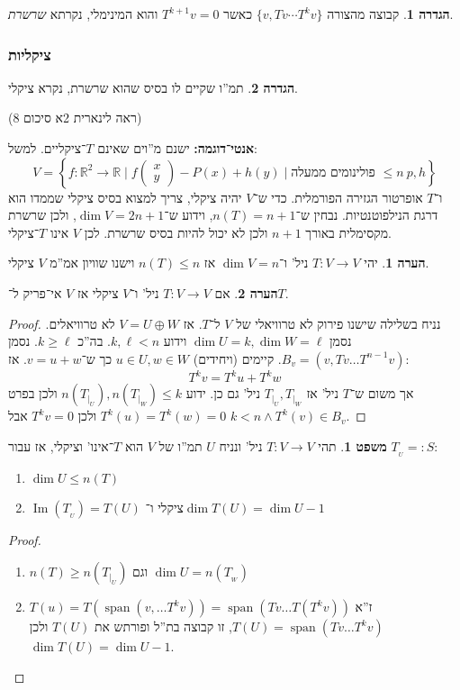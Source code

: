 \documentclass[a4paper]{article}
\newcommand\R     {\mathbb{R}}
\newcommand\ml    {\ell}
\DeclareMathOperator\Img   {Im}
\DeclareMathOperator{\Sp}      {span}
\newcommand\co        {\colon}
\newcommand\pms[1]    {\begin{pmatrix}
		#1
\end{pmatrix}}
\newcommand\ccb[1]    {\left \{ #1 \right \}}
\theoremstyle{definition}
\newtheorem{Theorem}{משפט}
\newtheorem{definition}{הגדרה}
\newtheorem{Remark}{הערה}
\newcommand\theo  [1] {\begin{Theorem}#1\end{Theorem}}
\newcommand\defi  [1] {\begin{definition}#1\end{definition}}
\newcommand\rmark [1] {\begin{Remark}#1\end{Remark}}
\begin{document}
	\defi{קבוצה מהצורה $\{v, Tv \cdots T^kv\}$ כאשר $T^{k + 1}v = 0$ והוא המינימלי, נקרתא \textit{שרשרת}. }
	
	\subsubsection{ציקליות}
	\defi{תמ''ו שקיים לו בסיס שהוא שרשרת, נקרא ציקלי. }(ראה לינארית 2א סיכום 8) %
	
	\textbf{אנטי־דוגמה: }ישנם מ''וים שאינם $T$־ציקליים. למשל: 
	\[ V = \ccb{f \co \R^2 \to \R \mid f\pms{x \\ y} - P(x) + h(y) \mid \text{פולינומים ממעלה $\le n$} \ p, h} \]
	ו־$T$ אופרטור הגזירה הפורמלית. 
	כדי ש־$V$ יהיה ציקלי, צריך למצוא בסיס ציקלי שממדו הוא דרגת הנילפוטנטיות. נבחין ש־$n(T) = n  + 1$, וידוע ש־$\dim V = 2n + 1$, ולכן שרשרת מקסימלית באורך $n + 1$ ולכן לא יכול להיות בסיס שרשרת. לכן $V$ אינו $T$־ציקלי. 
	
	\rmark{יהי $T \co V \to V$ ניל' ו־$\dim V = n$ אז $n(T) \le n$ וישנו שוויון אמ''מ $V$ ציקלי. }
	
	\rmark{אם $T \co V \to V$ ניל' ו־$V$ ציקלי אז $V$ אי־פריק ל־$T$. }
	\begin{proof}
		נניח בשלילה שישנו פירוק לא טרוויאלי של $V$ ל־$T$. אז $V = U \oplus W$ לא טרוויאלים. נסמן $\dim U = k, \dim W = \ml$ וידוע $k, \ml < n$. בה''כ $k \ge \ml$. נסמן $B_v = (v, Tv \dots T^{n - 1}v)$. קיימים (ויחידים) $u \in U, w \in W$ כך ש־$v = u + w$. אז: 
		\[ T^{k}v = T^ku + T^kw \]
		אך משום ש־$T$ ניל' אז $T_{|_U}, T_{|_W}$ ניל' גם כן. ידוע $n(T_{|_U}), n(T_{|_W}) \le k$ ולכן בפרט $T^{k}(u) = T^{k}(w) = 0$ ולכן $T^{k}v = 0$ אבל $k < n \land T^k(v) \in B_v$. 
	\end{proof}
	
	\theo{תהי $T \co V \to V$ ניל' ונניח $U$ תמ''ו של $V$ הוא $T$־אינו' וציקלי, אז עבור $T_{_U} =: S$: 
		\begin{enumerate}
			\item $\dim U \le n(T)$
			\item $\Img(T_{_U}) = T(U)$ ציקלי ו־$\dim T(U) = \dim U - 1$
	\end{enumerate}}
	\begin{proof}\,
		\begin{enumerate}
			\item $n(T) \ge n(T_{|_U})$ וגם $\dim U = n(T_{_W})$
			\item $T(u) = T(\Sp(v, \dots T^{k}v)) = \Sp (Tv \dots T(T^k v))$ ז''א $T(U) = \Sp(Tv \dots T^k v)$, זו קבוצה בת''ל ופורתש את $T(U)$ ולכן $\dim T(U) = \dim U - 1$. 
		\end{enumerate}
	\end{proof}
	
\end{document}
